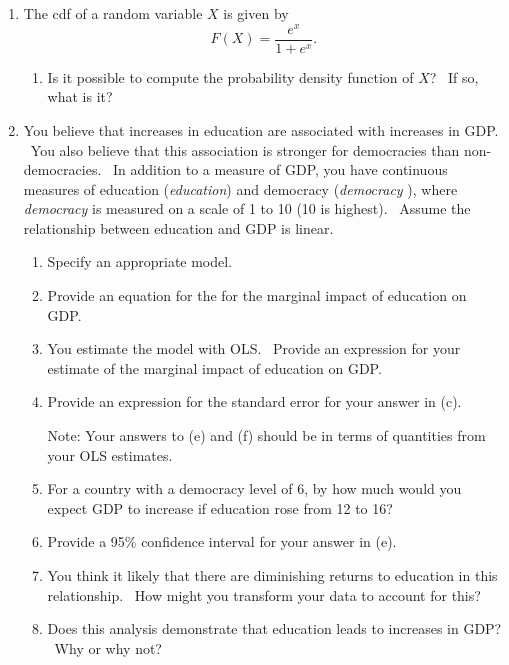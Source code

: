 \documentclass[11pt]{article}
\begin{document}
\begin{enumerate}
\item The cdf of a random variable $X$ is given by%
\begin{equation*}
F(X)=\frac{e^{x}}{1+e^{x}}.
\end{equation*}

\begin{enumerate}
\item Is it possible to compute the probability density function of $X$? \
If so, what is it?
\end{enumerate}

\item You believe that increases in education are associated with increases
in GDP. \ You also believe that this association is stronger for democracies
than non-democracies. \ In addition to a measure of GDP, you have continuous
measures of education (\textit{education}) and democracy (\textit{democracy}%
), where \textit{democracy} is measured on a scale of 1 to 10 (10 is
highest). \ Assume the relationship between education and GDP is linear. \ 

\begin{enumerate}
\item Specify an appropriate model.

\item Provide an equation for the for the marginal impact of education on
GDP.

\item You estimate the model with OLS. \ Provide an expression for your
estimate of the marginal impact of education on GDP.

\item Provide an expression for the standard error for your answer in (c).

Note: Your answers to (e) and (f) should be in terms of quantities from your
OLS estimates.

\item For a country with a democracy level of 6, by how much would you
expect GDP to increase if education rose from 12 to 16?

\item Provide a 95\% confidence interval for your answer in (e).

\item You think it likely that there are diminishing returns to education in
this relationship. \ How might you transform your data to account for this?

\item Does this analysis demonstrate that education leads to increases in
GDP? \ Why or why not?
\end{enumerate}


\end{enumerate}
\end{document}
